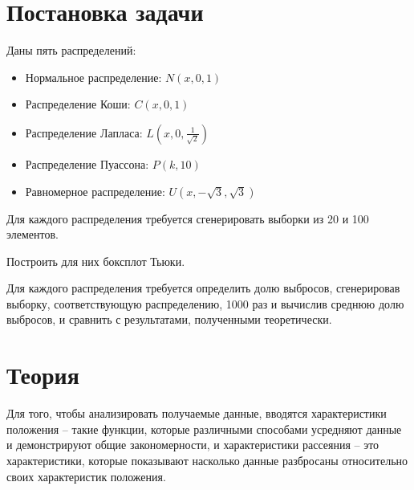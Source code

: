 \section{Постановка задачи}
Даны пять распределений:
\begin{itemize}
\item Нормальное распределение: $N(x, 0, 1)$
\item Распределение Коши: $C(x, 0, 1)$
\item Распределение Лапласа: $L(x, 0, \frac{1}{\sqrt{2}})$
\item Распределение Пуассона: $P(k, 10)$
\item Равномерное распределение: $U(x, -\sqrt{3}, \sqrt{3})$
\end{itemize}

Для каждого распределения требуется сгенерировать выборки из 20 и 100 элементов.

Построить для них боксплот Тьюки.

Для каждого распределения требуется определить долю выбросов, сгенерировав выборку, соответствующую распределению, 1000 раз и вычислив среднюю долю выбросов, и сравнить с результатами, полученными теоретически.

\section{Теория}

Для того, чтобы анализировать получаемые данные, вводятся характеристики положения -- такие функции, которые различными способами усредняют данные и демонстрируют общие закономерности, и характеристики рассеяния -- это характеристики, которые показывают насколько данные разбросаны относительно своих характеристик положения.

